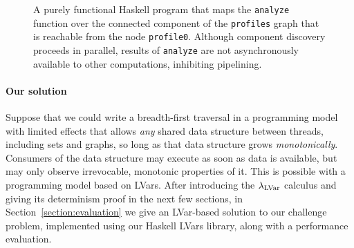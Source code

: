 \begin{figure}
  
  \caption{\footnotesize A purely functional Haskell program that maps the \lstinline|analyze| function over the connected
    component of the \lstinline|profiles| graph that is reachable from the node \lstinline|profile0|.  Although component discovery proceeds in parallel, results of
    \lstinline|analyze| are not asynchronously available to other computations, inhibiting pipelining.}
  \label{f:bfs-pure}
\end{figure}


\paragraph{Our solution}
%
Suppose that we could write a breadth-first traversal in a programming model with
limited effects
that allows {\em any} shared data structure between threads, including sets and
graphs, so long as that data structure grows {\em monotonically}.
Consumers of the data structure may execute as soon as data is available, but 
may only observe irrevocable, monotonic properties of it.
This is possible with a programming model based on LVars.  After 
introducing the $\textup{\ensuremath{\lambda_{\textrm{LVar}}}}$ calculus and giving its determinism proof in the next few
sections, in Section~\ref{section:evaluation} we give an LVar-based
solution to our challenge problem, implemented using our Haskell LVars library, along with a
performance evaluation.

